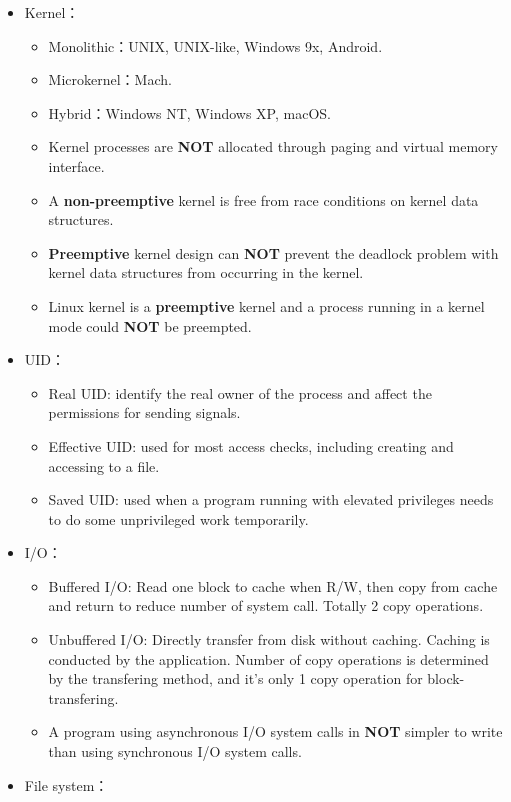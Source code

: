 \begin{itemize}
\begin{itemize}
    \end{itemize}
    \item Kernel：\begin{itemize}
        \item Monolithic：UNIX, UNIX-like, Windows 9x, Android.
        \item Microkernel：Mach.
        \item Hybrid：Windows NT, Windows XP, macOS.
        \item Kernel processes are \textbf{NOT} allocated through paging and virtual memory interface.
        \item A \textbf{non-preemptive} kernel is free from race conditions on kernel data structures.
        \item \textbf{Preemptive} kernel design can \textbf{NOT} prevent the deadlock problem with kernel data structures from occurring in the kernel.
        \item Linux kernel is a \textbf{preemptive} kernel and a process running in a kernel mode could \textbf{NOT} be preempted.
    \end{itemize}
    \item UID：\begin{itemize}
        \item Real UID: identify the real owner of the process and affect the permissions for sending signals.
        \item Effective UID: used for most access checks, including creating and accessing to a file.
        \item Saved UID: used when a program running with elevated privileges needs to do some unprivileged work temporarily.
    \end{itemize}
    \item I/O：\begin{itemize}
        \item Buffered I/O: Read one block to cache when R/W, then copy from cache and return to reduce number of system call. Totally 2 copy operations.
        \item Unbuffered I/O: Directly transfer from disk without caching. Caching is conducted by the application. Number of copy operations is determined by the transfering method, and it's only 1 copy operation for block-transfering. 
        \item A program using asynchronous I/O system calls in \textbf{NOT} simpler to write than using synchronous I/O system calls.
    \end{itemize}
    \item File system： \begin{itemize}

\end{itemize}
\end{itemize}
